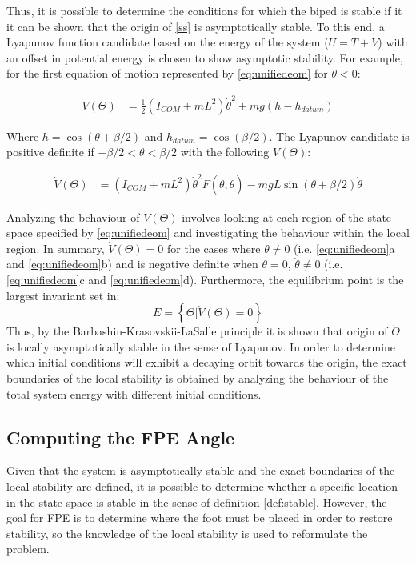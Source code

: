 Thus, it is possible to determine the conditions for which the biped is stable if it it can be shown that the origin of \eqref{ss} is asymptotically stable. To this end, a Lyapunov function candidate based on the energy of the system ($U = T + V$) with an offset in potential energy is chosen to show asymptotic stability. For example, for the first equation of motion represented by \eqref{eq:unifiedeom} for $\theta < 0$: 

\begin{equation}
	\begin{aligned}
		V(\Theta) &= {\frac{1}{2}({I_{COM}} + m{L^2}){\dot \theta ^2} + mg(h - {h_{datum}})}	
		\end{aligned}
\end{equation}

Where $h =\cos (\theta+\beta/2) $ and $h_{datum} = \cos (\beta/2)$. The Lyapunov candidate is positive definite if $-\beta/2 < \theta < \beta/2$ with the following $\dot{V}(\Theta)$: 

\begin{equation}
	\begin{aligned}
			\dot{V}(\Theta) &= ({I_{COM}} + m{L^2}){\dot \theta ^2}F(\theta ,\dot \theta ) - mgL\sin (\theta  + \beta /2)\dot \theta
	\end{aligned}
\end{equation}

Analyzing the behaviour of $\dot{V}(\Theta)$ involves looking at each region of the state space specified by \eqref{eq:unifiedeom} and investigating the behaviour within the local region. In summary, $\dot{V}(\Theta) = 0$ for the cases where $\theta \not= 0$  (i.e. \ref{eq:unifiedeom}a and \ref{eq:unifiedeom}b) and is negative definite when $\theta = 0$, $\dot{\theta} \not= 0$ (i.e. \ref{eq:unifiedeom}c and \ref{eq:unifiedeom}d). Furthermore, the equilibrium point is the largest invariant set in: 
\[E = \left\{ {\Theta |\dot V(\Theta ) = 0} \right\}\]
Thus, by the Barbashin-Krasovskii-LaSalle principle it is shown that origin of $\dot{\Theta}$ is locally asymptotically stable in the sense of Lyapunov. In order to determine which initial conditions will exhibit a decaying orbit towards the origin, the exact boundaries of the local stability is obtained by analyzing the behaviour of the total system energy with different initial conditions. 

\subsection{Computing the FPE Angle} %
\label{sub:computing_the_fpe_angle}
Given that the system is asymptotically stable and the exact boundaries of the local stability are defined, it is possible to determine whether a specific location in the state space is stable in the sense of definition \ref{def:stable}. However, the goal for FPE is to determine where the foot must be placed in order to restore stability, so the knowledge of the local stability is used to reformulate the problem. 

